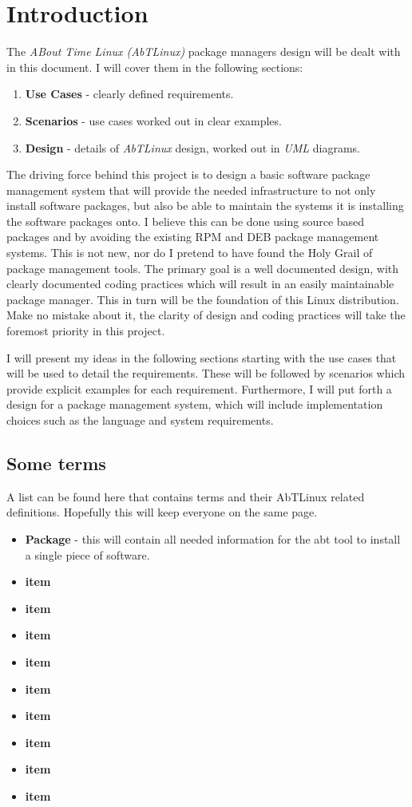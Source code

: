 \section{Introduction}  
The \emph{ABout Time Linux (AbTLinux)} package managers design will be dealt with in
this document. I will cover them in the following sections:
 
\begin{enumerate}
	\item \textbf{Use Cases} - clearly defined requirements.
	\item \textbf{Scenarios} - use cases worked out in clear examples.
	\item \textbf{Design} - details of \emph{AbTLinux} design, worked out in
		\emph{UML} diagrams.
\end{enumerate}

The driving force behind this project is to design a basic software
package management system that will provide the needed infrastructure to not
only install software packages, but also be able to maintain the systems it is
installing the software packages onto. I believe this can be done using
source based packages and by avoiding the existing RPM and DEB package
management systems. This is not new, nor do I pretend to have found the Holy
Grail of package management tools. The primary goal is a well documented design, with
clearly documented coding practices which will result in an easily
maintainable package manager. This in turn will be the foundation of this Linux
distribution. Make no mistake about it, the clarity of design and coding
practices will take the foremost priority in this project.

I will present my ideas in the following sections starting with the use cases
that will be used to detail the requirements. These will be followed by
scenarios which provide explicit examples for each requirement. Furthermore, I
will put forth a design for a package management system, which will include
implementation choices such as the language and system requirements.

\subsection{Some terms}
A list can be found here that contains terms and their AbTLinux related
definitions. Hopefully this will keep everyone on the same page.

\begin{itemize}
  \item \textbf{Package} - this will contain all needed information for the
abt tool to install a single piece of software.
  \item \textbf{item}
  \item \textbf{item}
  \item \textbf{item}
  \item \textbf{item}
  \item \textbf{item}
  \item \textbf{item}
  \item \textbf{item}
  \item \textbf{item}
  \item \textbf{item}
\end{itemize}
